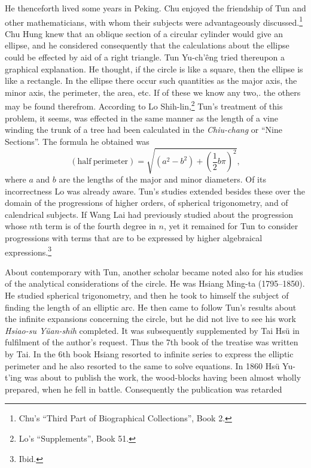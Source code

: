 \documentclass[11pt]{article}
\newcommand{\scanpage}[2]{\clearpage\setcounter{footnote}{0}\noindent{\footnotesize\color{gray}PDF page #1 · #2}\par\medskip}
\newcommand{\scanfooter}{}
\begin{document}
\scanpage{0165}{Chapter 21, printed page 151}
He thenceforth lived some years in Peking. Chu enjoyed the friendship of Tun and other mathematicians, with whom their subjects were advantageously discussed.\footnote{Chu's ``Third Part of Biographical Collections'', Book 2.} Chu Hung knew that an oblique section of a circular cylinder would give an ellipse, and he considered consequently that the calculations about the ellipse could be effected by aid of a right triangle. Tun Yu-ch'êng tried thereupon a graphical explanation. He thought, if the circle is like a square, then the ellipse is like a rectangle. In the ellipse there occur such quantities as the major axis, the minor axis, the perimeter, the area, etc. If of these we know any two,. the others may be found therefrom. According to Lo Shih-lin,\footnote{Lo's ``Supplements'', Book 51.} Tun's treatment of this problem, it seems, was effected in the same manner as the length of a vine winding the trunk of a tree had been calculated in the \emph{Chiu-chang} or ``Nine Sections''. The formula he obtained was
\[
(\mathrm{half\ perimeter})=\sqrt{(a^2-b^2)+\left(\frac12b\pi\right)^2},
\]
where $a$ and $b$ are the lengths of the major and minor diameters. Of its incorrectness Lo was already aware. Tun's studies extended besides these over the domain of the progressions of higher orders, of spherical trigonometry, and of calendrical subjects. If Wang Lai had previously studied about the progression whose $n$th term is of the fourth degree in $n$, yet it remained for Tun to consider progressions with terms that are to be expressed by higher algebraical expressions.\footnote{Ibid.}

About contemporary with Tun, another scholar became noted also for his studies of the analytical considerations of the circle. He was Hsiang Ming-ta (1795--1850). He studied spherical trigonometry, and then he took to himself the subject of finding the length of an elliptic arc. He then came to follow Tun's results about the infinite expansions concerning the circle, but he did not live to see his work \emph{Hsiao-su Yüan-shih} completed. It was subsequently supplemented by Tai Hsü in fulfilment of the author's request. Thus the 7th book of the treatise was written by Tai. In the 6th book Hsiang resorted to infinite series to express the elliptic perimeter and he also resorted to the same to solve equations. In 1860 Hsü Yu-t'ing was about to publish the work, the wood-blocks having been almost wholly prepared, when he fell in battle. Consequently the publication was retarded
\scanfooter
\end{document}
